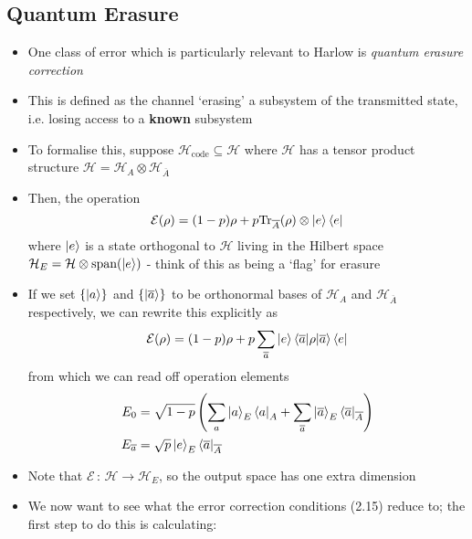 \documentclass[12pt,a4paper]{article}
\numberwithin{equation}{section}
\newcommand{\ketbra}[2]{\ket{#1}\bra{#2}}
\newcommand{\ketbras}[1]{\ketbra{#1}{#1}}
\begin{document}
	\subsection{Quantum Erasure}
	\begin{itemize}
		\item One class of error which is particularly relevant to Harlow is \textit{quantum erasure correction}
		\item This is defined as the channel `erasing' a subsystem of the transmitted state, i.e. losing access to a \textbf{known} subsystem 
		\item To formalise this, suppose $\mathcal{H}_{\text{code}}\subseteq \mathcal{H}$ where $\mathcal{H}$ has a tensor product structure $\mathcal{H}=\mathcal{H}_{A}\otimes\mathcal{H}_{\overline{A}}$
		\item Then, the operation 
		\begin{equation}
			\mathcal{E}(\rho)=(1-p)\rho+p\text{Tr}_{\overline{A}}(\rho)\otimes\ketbras{e}
		\end{equation}
		where $\ket{e}$ is a state orthogonal to $\mathcal{H}$ living in the Hilbert space $\mathcal{H}_{E}=\mathcal{H}\otimes\text{span}(\ket{e})$ - think of this as being a `flag' for erasure
		\item If we set $\{\ket{a}\}$ and $\{\ket{\overline{a}}\}$ to be orthonormal bases of $\mathcal{H}_{A}$ and $\mathcal{H}_{\overline{A}}$ respectively, we can rewrite this explicitly as
		\begin{equation}
			\mathcal{E}(\rho)=(1-p)\rho+p\sum_{\overline{a}}\ket{e}\braket{\overline{a}|\rho|\overline{a}}\bra{e}
		\end{equation}
		from which we can read off operation elements
		\begin{equation}
			\begin{aligned}
				E_{0}&=\sqrt{1-p}\left(\sum_{a}\ket{a}_{E}\bra{a}_{A}+\sum_{\overline{a}}\ket{\overline{a}}_{E}\bra{\overline{a}}_{\overline{A}}\right)\\
				E_{\overline{a}}&=\sqrt{p}\ket{e}_{E}\bra{\overline{a}}_{\overline{A}}
			\end{aligned}
		\end{equation}
		\item Note that $\mathcal{E}\,:\,\mathcal{H}\to\mathcal{H}_{E}$, so the output space has one extra dimension
		\item We now want to see what the error correction conditions (2.15) reduce to; the first step to do this is calculating:
		\begin{equation}

\end{equation}
\end{itemize}
\end{document}
